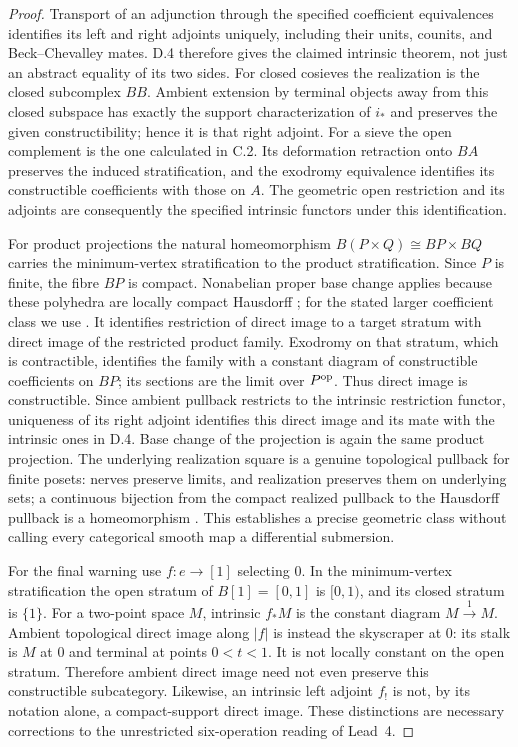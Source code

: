\begin{proof}
Transport of an adjunction through the specified coefficient equivalences identifies its left and right adjoints uniquely, including their units, counits, and Beck--Chevalley mates. D.4 therefore gives the claimed intrinsic theorem, not just an abstract equality of its two sides. For closed cosieves the realization is the closed subcomplex $BB$. Ambient extension by terminal objects away from this closed subspace has exactly the support characterization of $i_*$ and preserves the given constructibility; hence it is that right adjoint. For a sieve the open complement is the one calculated in C.2. Its deformation retraction onto $BA$ preserves the induced stratification, and the exodromy equivalence identifies its constructible coefficients with those on $A$. The geometric open restriction and its adjoints are consequently the specified intrinsic functors under this identification.

For product projections the natural homeomorphism $B(P\times Q)\cong BP\times BQ$ carries the minimum-vertex stratification to the product stratification. Since $P$ is finite, the fibre $BP$ is compact. Nonabelian proper base change applies because these polyhedra are locally compact Hausdorff \citep[Corollary~7.3.1.18]{FLurieHTT2009}; for the stated larger coefficient class we use \citet[Corollary~3.2, Proposition~3.8, and Subexample~3.15]{CDHaine2022}. It identifies restriction of direct image to a target stratum with direct image of the restricted product family. Exodromy on that stratum, which is contractible, identifies the family with a constant diagram of constructible coefficients on $BP$; its sections are the limit over $P^{\mathrm{op}}$. Thus direct image is constructible. Since ambient pullback restricts to the intrinsic restriction functor, uniqueness of its right adjoint identifies this direct image and its mate with the intrinsic ones in D.4. Base change of the projection is again the same product projection. The underlying realization square is a genuine topological pullback for finite posets: nerves preserve limits, and realization preserves them on underlying sets; a continuous bijection from the compact realized pullback to the Hausdorff pullback is a homeomorphism \citep[Theorem~3.6.2.1]{CDKerodon013D}. This establishes a precise geometric class without calling every categorical smooth map a differential submersion.

For the final warning use $f:e\to[1]$ selecting $0$. In the minimum-vertex stratification the open stratum of $B[1]=[0,1]$ is $[0,1)$, and its closed stratum is $\{1\}$. For a two-point space $M$, intrinsic $f_*M$ is the constant diagram $M\xrightarrow{1}M$. Ambient topological direct image along $|f|$ is instead the skyscraper at $0$: its stalk is $M$ at $0$ and terminal at points $0<t<1$. It is not locally constant on the open stratum. Therefore ambient direct image need not even preserve this constructible subcategory. Likewise, an intrinsic left adjoint $f_!$ is not, by its notation alone, a compact-support direct image. These distinctions are necessary corrections to the unrestricted six-operation reading of Lead~4.
\end{proof}

